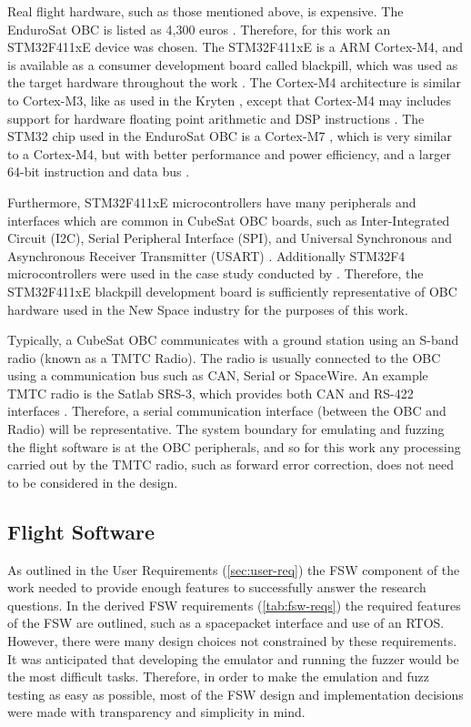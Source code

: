\documentclass[../report.tex]{subfiles}
\begin{document}
Real flight hardware, such as those mentioned above, is expensive. The
EnduroSat OBC is listed as 4,300 euros \citep{EnduroSat_OBC}. Therefore, for
this work an STM32F411xE device was chosen. The STM32F411xE is a ARM Cortex-M4, and
is available as a consumer development board called blackpill, which was used
as the target hardware throughout the work \citep{blackpill_info}. The
Cortex-M4 architecture is similar to Cortex-M3, like as used in the Kryten
\citep{Clydespace_Kryten}, except that Cortex-M4 may includes support for
hardware floating point arithmetic and DSP instructions \citep{Cortex_M3}
\citep{Cortex_M4}. The STM32 chip used in the EnduroSat OBC is a Cortex-M7
\citep{EnduroSat_OBC}, which is very similar to a Cortex-M4, but with better
performance and power efficiency, and a larger 64-bit instruction and data bus
\citep{Cortex_M7}.

Furthermore, STM32F411xE microcontrollers have many peripherals and interfaces
which are common in CubeSat OBC boards, such as Inter-Integrated Circuit (I2C),
Serial Peripheral Interface (SPI), and Universal Synchronous and Asynchronous
Receiver Transmitter (USART) \citep{Cratere_2024}. Additionally STM32F4
microcontrollers were used in the case study conducted by
\citet{Scharnowski_2023}. Therefore, the STM32F411xE blackpill development board
is sufficiently representative of OBC hardware used in the New Space industry
for the purposes of this work.

Typically, a CubeSat OBC communicates with a ground station using an S-band
radio (known as a TMTC Radio). The radio is usually connected to the OBC using
a communication bus such as CAN, Serial or SpaceWire. An example TMTC radio is
the Satlab SRS-3, which provides both CAN and RS-422 interfaces
\citep{Satlab_SRS3}. Therefore, a serial communication interface (between the
OBC and Radio) will be representative. The system boundary for emulating and
fuzzing the flight software is at the OBC peripherals, and so for this work any
processing carried out by the TMTC radio, such as forward error correction, does
not need to be considered in the design.

\subsection{Flight Software} \label{sec:fsw-design}

As outlined in the User Requirements (\autoref{sec:user-req}) the FSW component
of the work needed to provide enough features to successfully answer the
research questions. In the derived FSW requirements (\autoref{tab:fsw-reqs})
the required features of the FSW are outlined, such as a spacepacket interface
and use of an RTOS. However, there were many design choices not constrained
by these requirements. It was anticipated that developing the emulator and
running the fuzzer would be the most difficult tasks. Therefore, in order to
make the emulation and fuzz testing as easy as possible, most of the FSW design
and implementation decisions were made with transparency and simplicity in
mind.
\end{document}
